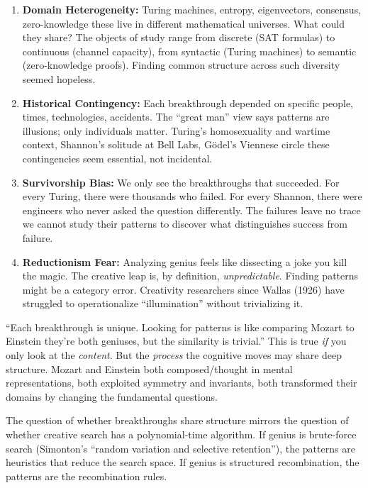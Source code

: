 \begin{enumerate}
\item \textbf{Domain Heterogeneity:} Turing machines, entropy, eigenvectors, consensus, zero-knowledge these live in different mathematical universes. What could they share? The objects of study range from discrete (SAT formulas) to continuous (channel capacity), from syntactic (Turing machines) to semantic (zero-knowledge proofs). Finding common structure across such diversity seemed hopeless.

\item \textbf{Historical Contingency:} Each breakthrough depended on specific people, times, technologies, accidents. The ``great man'' view says patterns are illusions; only individuals matter. Turing's homosexuality and wartime context, Shannon's solitude at Bell Labs, G\"odel's Viennese circle these contingencies seem essential, not incidental.

\item \textbf{Survivorship Bias:} We only see the breakthroughs that succeeded. For every Turing, there were thousands who failed. For every Shannon, there were engineers who never asked the question differently. The failures leave no trace we cannot study their patterns to discover what distinguishes success from failure.

\item \textbf{Reductionism Fear:} Analyzing genius feels like dissecting a joke you kill the magic. The creative leap is, by definition, \emph{unpredictable}. Finding patterns might be a category error. Creativity researchers since Wallas (1926) have struggled to operationalize ``illumination'' without trivializing it.
\end{enumerate}

``Each breakthrough is unique. Looking for patterns is like comparing Mozart to Einstein they're both geniuses, but the similarity is trivial.'' This is true \emph{if} you only look at the \emph{content}. But the \emph{process} the cognitive moves may share deep structure. Mozart and Einstein both composed/thought in mental representations, both exploited symmetry and invariants, both transformed their domains by changing the fundamental questions.

The question of whether breakthroughs share structure mirrors the question of whether creative search has a polynomial-time algorithm. If genius is brute-force search (Simonton's ``random variation and selective retention''), the patterns are heuristics that reduce the search space. If genius is structured recombination, the patterns are the recombination rules.

